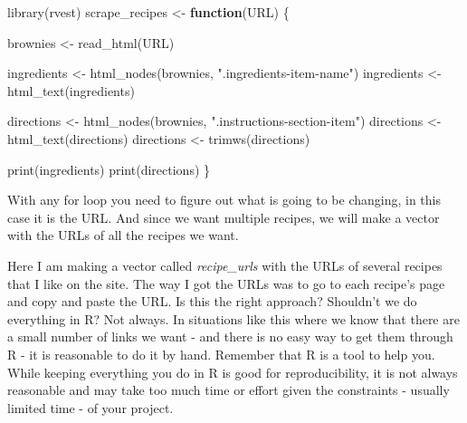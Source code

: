 \documentclass[
]{krantz}
\makeatletter
\newenvironment{Shaded}{\begin{snugshade}}{\end{snugshade}}
\newcommand{\ControlFlowTok}[1]{\textcolor[rgb]{0.27,0.27,0.27}{\textbf{#1}}}
\newcommand{\FunctionTok}[1]{\textcolor[rgb]{0,0,0}{#1}}
\newcommand{\NormalTok}[1]{#1}
\newcommand{\OtherTok}[1]{\textcolor[rgb]{0.37,0.37,0.37}{#1}}
\newcommand{\StringTok}[1]{\textcolor[rgb]{0.5,0.5,0.5}{#1}}
\newenvironment{kframe}{%
\medskip{}
\setlength{\fboxsep}{.8em}
 \def\at@end@of@kframe{}%
 \ifinner\ifhmode%
  \def\at@end@of@kframe{\end{minipage}}%
  \begin{minipage}{\columnwidth}%
 \fi\fi%
 \def\FrameCommand##1{\hskip\@totalleftmargin \hskip-\fboxsep
 \colorbox{shadecolor}{##1}\hskip-\fboxsep
     \hskip-\linewidth \hskip-\@totalleftmargin \hskip\columnwidth}%
 \MakeFramed {\advance\hsize-\width
   \@totalleftmargin\z@ \linewidth\hsize
   \@setminipage}}%
 {\par\unskip\endMakeFramed%
 \at@end@of@kframe}
\renewenvironment{Shaded}{\begin{kframe}}{\end{kframe}}
\makeatother
\begin{document}
\begin{Shaded}
\begin{Highlighting}[]
\FunctionTok{library}\NormalTok{(rvest)}
\NormalTok{scrape\_recipes }\OtherTok{\textless{}{-}} \ControlFlowTok{function}\NormalTok{(URL) \{}
  
\NormalTok{  brownies }\OtherTok{\textless{}{-}} \FunctionTok{read\_html}\NormalTok{(URL)}
  
\NormalTok{  ingredients }\OtherTok{\textless{}{-}} \FunctionTok{html\_nodes}\NormalTok{(brownies, }\StringTok{".ingredients{-}item{-}name"}\NormalTok{)}
\NormalTok{  ingredients }\OtherTok{\textless{}{-}} \FunctionTok{html\_text}\NormalTok{(ingredients)}
  
\NormalTok{  directions }\OtherTok{\textless{}{-}} \FunctionTok{html\_nodes}\NormalTok{(brownies, }\StringTok{".instructions{-}section{-}item"}\NormalTok{)}
\NormalTok{  directions }\OtherTok{\textless{}{-}} \FunctionTok{html\_text}\NormalTok{(directions)}
\NormalTok{  directions }\OtherTok{\textless{}{-}} \FunctionTok{trimws}\NormalTok{(directions)}
  
  \FunctionTok{print}\NormalTok{(ingredients)}
  \FunctionTok{print}\NormalTok{(directions)}
\NormalTok{\}}
\end{Highlighting}
\end{Shaded}

With any for loop you need to figure out what is going to be changing, in this case it is the URL. And since we want multiple recipes, we will make a vector with the URLs of all the recipes we want.

Here I am making a vector called \emph{recipe\_urls} with the URLs of several recipes that I like on the site. The way I got the URLs was to go to each recipe's page and copy and paste the URL. Is this the right approach? Shouldn't we do everything in R? Not always. In situations like this where we know that there are a small number of links we want - and there is no easy way to get them through R - it is reasonable to do it by hand. Remember that R is a tool to help you. While keeping everything you do in R is good for reproducibility, it is not always reasonable and may take too much time or effort given the constraints - usually limited time - of your project.
\end{document}
